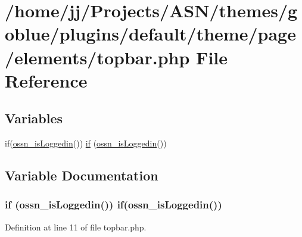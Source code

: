 \hypertarget{themes_2goblue_2plugins_2default_2theme_2page_2elements_2topbar_8php}{}\section{/home/jj/\+Projects/\+A\+S\+N/themes/goblue/plugins/default/theme/page/elements/topbar.php File Reference}
\label{themes_2goblue_2plugins_2default_2theme_2page_2elements_2topbar_8php}
\subsection*{Variables}
\begin{DoxyCompactItemize}
\item 
if(\hyperlink{ossn_8lib_8users_8php_a709b82b89b564332723652ed2a36e6b8}{ossn\+\_\+is\+Loggedin}()) \hyperlink{themes_2goblue_2plugins_2default_2theme_2page_2elements_2topbar_8php_af0beb2f2026507bbb03a1597a199d79f}{if} (\hyperlink{ossn_8lib_8users_8php_a709b82b89b564332723652ed2a36e6b8}{ossn\+\_\+is\+Loggedin}())
\end{DoxyCompactItemize}


\subsection{Variable Documentation}
\subsubsection[{\texorpdfstring{if}{if}}]{\setlength{\rightskip}{0pt plus 5cm}if ({\bf ossn\+\_\+is\+Loggedin}()) if({\bf ossn\+\_\+is\+Loggedin}())}\hypertarget{themes_2goblue_2plugins_2default_2theme_2page_2elements_2topbar_8php_af0beb2f2026507bbb03a1597a199d79f}{}\label{themes_2goblue_2plugins_2default_2theme_2page_2elements_2topbar_8php_af0beb2f2026507bbb03a1597a199d79f}


Definition at line 11 of file topbar.\+php.

